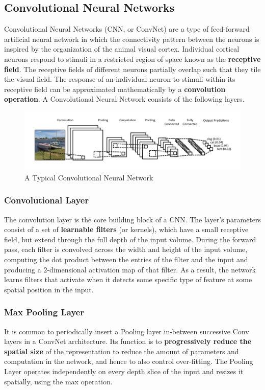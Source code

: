 \documentclass[11pt]{article}
\begin{document}
			\subsection{Convolutional Neural Networks}
			Convolutional Neural Networks (CNN, or ConvNet) are a type of feed-forward artificial neural network in which the connectivity pattern between the neurons is inspired by the organization of the animal visual cortex. Individual cortical neurons respond to stimuli in a restricted region of space known as the \textbf{receptive field}. The receptive fields of different neurons partially overlap such that they tile the visual field. The response of an individual neuron to stimuli within its receptive field can be approximated mathematically by a \textbf{convolution operation}. A Convolutional Neural Network consists of the following layers.\cite{showandtell}
								
				\begin{figure}[ht!]
					\includegraphics[width=1.0\textwidth]{conv.png}
					\caption{A Typical Convolutional Neural Network\label{fig4}}
				\end{figure}
				\subsubsection{Convolutional Layer}
					The convolution layer is the core building block of a CNN. The layer's parameters consist of a set of \textbf{learnable filters} (or kernels), which have a small receptive field, but extend through the full depth of the input volume. During the forward pass, each filter is convolved across the width and height of the input volume, computing the dot product between the entries of the filter and the input and producing a $2$-dimensional activation map of that filter.\cite{cs231n} As a result, the network learns filters that activate when it detects some specific type of feature at some spatial position in the input.

				\subsubsection{Max Pooling Layer}
					It is common to periodically insert a Pooling layer in-between successive Conv layers in a ConvNet architecture. Its function is to \textbf{progressively reduce the spatial size} of the representation to reduce the amount of parameters and computation in the network, and hence to also control over-fitting. The Pooling Layer operates independently on every depth slice of the input and resizes it spatially, using the max operation.\cite{cs231n}
\end{document}
